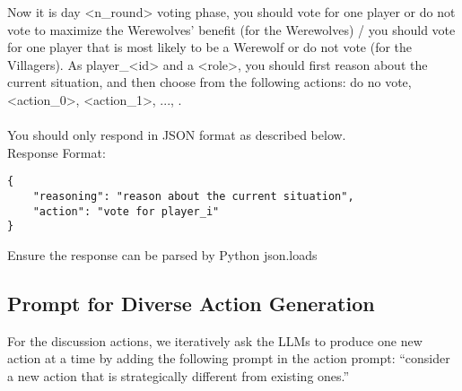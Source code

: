 \begin{tcolorbox}

{\ttfamily\small
Now it is day <n\_round> voting phase, you should vote for one player or do not vote to maximize the Werewolves' benefit (for the Werewolves) / you should vote for one player that is most likely to be a Werewolf or do not vote (for the Villagers).
As player\_<id> and a <role>, you should first reason about the current situation, and then choose from the following actions: do no vote, <action\_0>, <action\_1>, ..., .
\\
\\
You should only respond in JSON format as described below.
\\
Response Format:
\begin{verbatim}
{
    "reasoning": "reason about the current situation",
    "action": "vote for player_i"
}
\end{verbatim}
Ensure the response can be parsed by Python json.loads
}
\end{tcolorbox}

\subsection{Prompt for Diverse Action Generation}
For the discussion actions, we iteratively ask the LLMs to produce one new action at a time by adding the following prompt in the action prompt: ``consider a new action that is strategically different from existing ones.''
